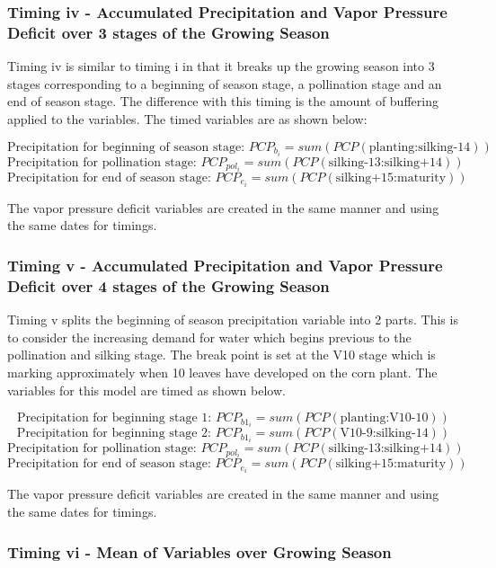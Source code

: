 \subsubsection{Timing iv - Accumulated Precipitation and Vapor Pressure Deficit over 3 stages of the Growing Season}

Timing iv is similar to timing i in that it breaks up the growing season into 3 stages corresponding to a beginning of season stage, a pollination stage and an end of season stage. The difference with this timing is the amount of buffering applied to the variables. The timed variables are as shown below:

$$\text{Precipitation for beginning of season stage: }PCP_{b_i}=sum(PCP(\text{planting:silking-14}))$$
$$\text{Precipitation for pollination stage: }PCP_{pol_i}=sum(PCP(\text{silking-13:silking+14}))$$
$$\text{Precipitation for end of season stage: }PCP_{e_i}=sum(PCP(\text{silking+15:maturity}))$$

The vapor pressure deficit variables are created in the same manner and using the same dates for timings. 


\subsubsection{Timing v - Accumulated Precipitation and Vapor Pressure Deficit over 4 stages of the Growing Season}

Timing v splits the beginning of season precipitation variable into 2 parts. This is to consider the increasing demand for water which begins previous to the pollination and silking stage. The break point is set at the V10 stage which is marking approximately when 10 leaves have developed on the corn plant. The variables for this model are timed as shown below.

$$\text{Precipitation for beginning stage 1: }PCP_{b1_i}=sum(PCP(\text{planting:V10-10}))$$
$$\text{Precipitation for beginning stage 2: }PCP_{b1_i}=sum(PCP(\text{V10-9:silking-14}))$$
$$\text{Precipitation for pollination stage: }PCP_{pol_i}=sum(PCP(\text{silking-13:silking+14}))$$
$$\text{Precipitation for end of season stage: }PCP_{e_i}=sum(PCP(\text{silking+15:maturity}))$$

The vapor pressure deficit variables are created in the same manner and using the same dates for timings. 

\subsubsection{Timing vi - Mean of Variables over Growing Season}

